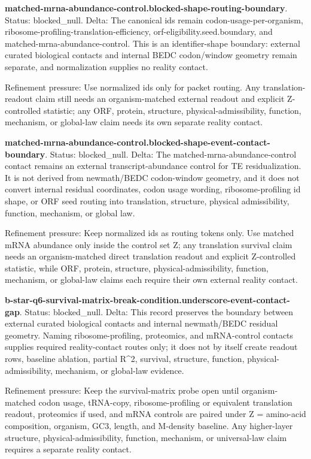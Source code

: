 \textbf{matched-mrna-abundance-control.blocked-shape-routing-boundary}. Status: blocked\_null. Delta: The canonical ids remain codon-usage-per-organism, ribosome-profiling-translation-efficiency, orf-eligibility.seed.boundary, and matched-mrna-abundance-control. This is an identifier-shape boundary: external curated biological contacts and internal BEDC codon/window geometry remain separate, and normalization supplies no reality contact.

Refinement pressure: Use normalized ids only for packet routing. Any translation-readout claim still needs an organism-matched external readout and explicit Z-controlled statistic; any ORF, protein, structure, physical-admissibility, function, mechanism, or global-law claim needs its own separate reality contact.

\textbf{matched-mrna-abundance-control.blocked-shape-event-contact-boundary}. Status: blocked\_null. Delta: The matched-mrna-abundance-control contact remains an external transcript-abundance control for TE residualization. It is not derived from newmath/BEDC codon-window geometry, and it does not convert internal residual coordinates, codon usage wording, ribosome-profiling id shape, or ORF seed routing into translation, structure, physical admissibility, function, mechanism, or global law.

Refinement pressure: Keep normalized ids as routing tokens only. Use matched mRNA abundance only inside the control set Z; any translation survival claim needs an organism-matched direct translation readout and explicit Z-controlled statistic, while ORF, protein, structure, physical-admissibility, function, mechanism, or global-law claims each require their own external reality contact.

\textbf{b-star-q6-survival-matrix-break-condition.underscore-event-contact-gap}. Status: blocked\_null. Delta: This record preserves the boundary between external curated biological contacts and internal newmath/BEDC residual geometry. Naming ribosome-profiling, proteomics, and mRNA-control contacts supplies required reality-contact routes only; it does not by itself create readout rows, baseline ablation, partial R\textasciicircum{}2, survival, structure, function, physical-admissibility, mechanism, or global-law evidence.

Refinement pressure: Keep the survival-matrix probe open until organism-matched codon usage, tRNA-copy, ribosome-profiling or equivalent translation readout, proteomics if used, and mRNA controls are paired under Z = amino-acid composition, organism, GC3, length, and M-density baseline. Any higher-layer structure, physical-admissibility, function, mechanism, or universal-law claim requires a separate reality contact.

